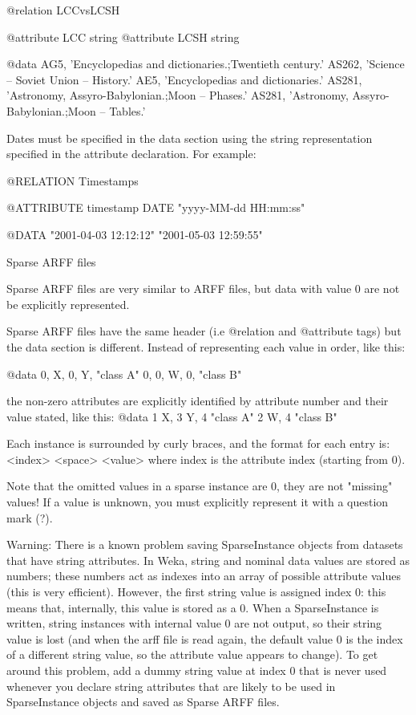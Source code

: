     @relation LCCvsLCSH

    @attribute LCC string
    @attribute LCSH string

    @data
    AG5,   'Encyclopedias and dictionaries.;Twentieth century.'
    AS262, 'Science -- Soviet Union -- History.'
    AE5,   'Encyclopedias and dictionaries.'
    AS281, 'Astronomy, Assyro-Babylonian.;Moon -- Phases.'
    AS281, 'Astronomy, Assyro-Babylonian.;Moon -- Tables.'
   
Dates must be specified in the data section using the string representation specified in the attribute declaration. For example:

    @RELATION Timestamps

    @ATTRIBUTE timestamp DATE "yyyy-MM-dd HH:mm:ss" 

    @DATA 
    "2001-04-03 12:12:12"
    "2001-05-03 12:59:55"
   
Sparse ARFF files

Sparse ARFF files are very similar to ARFF files, but data with value 0 are not be explicitly represented.

Sparse ARFF files have the same header (i.e @relation and @attribute tags) but the data section is different. Instead of representing each value in order, like this:

    @data
    0, X, 0, Y, "class A"
    0, 0, W, 0, "class B"
   
the non-zero attributes are explicitly identified by attribute number and their value stated, like this:
    @data
    {1 X, 3 Y, 4 "class A"}
    {2 W, 4 "class B"}
   
Each instance is surrounded by curly braces, and the format for each entry is: <index> <space> <value> where index is the attribute index (starting from 0).

Note that the omitted values in a sparse instance are 0, they are not "missing" values! If a value is unknown, you must explicitly represent it with a question mark (?).

Warning: There is a known problem saving SparseInstance objects from datasets that have string attributes. In Weka, string and nominal data values are stored as numbers; these numbers act as indexes into an array of possible attribute values (this is very efficient). However, the first string value is assigned index 0: this means that, internally, this value is stored as a 0. When a SparseInstance is written, string instances with internal value 0 are not output, so their string value is lost (and when the arff file is read again, the default value 0 is the index of a different string value, so the attribute value appears to change). To get around this problem, add a dummy string value at index 0 that is never used whenever you declare string attributes that are likely to be used in SparseInstance objects and saved as Sparse ARFF files.
